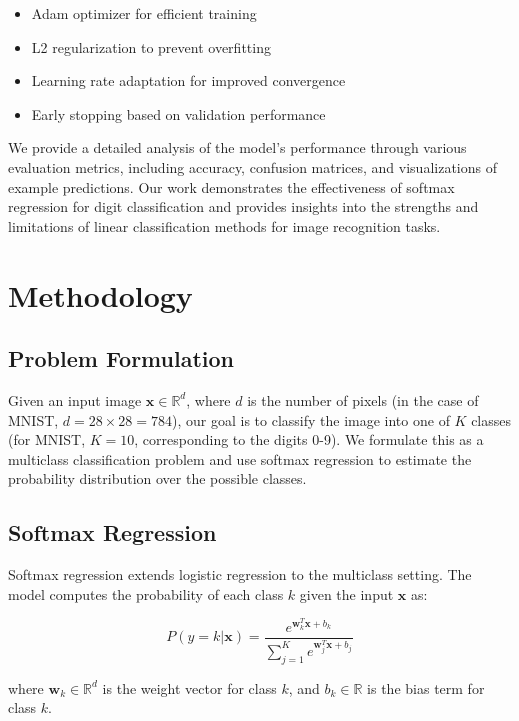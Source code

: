 \documentclass[10pt,journal,compsoc]{IEEEtran}
\begin{document}
\begin{itemize}
    \item Adam optimizer for efficient training
    \item L2 regularization to prevent overfitting
    \item Learning rate adaptation for improved convergence
    \item Early stopping based on validation performance
\end{itemize}

We provide a detailed analysis of the model's performance through various evaluation metrics, including accuracy, confusion matrices, and visualizations of example predictions. Our work demonstrates the effectiveness of softmax regression for digit classification and provides insights into the strengths and limitations of linear classification methods for image recognition tasks.

\section{Methodology}
\subsection{Problem Formulation}
Given an input image $\mathbf{x} \in \mathbb{R}^d$, where $d$ is the number of pixels (in the case of MNIST, $d = 28 \times 28 = 784$), our goal is to classify the image into one of $K$ classes (for MNIST, $K = 10$, corresponding to the digits 0-9). We formulate this as a multiclass classification problem and use softmax regression to estimate the probability distribution over the possible classes.

\subsection{Softmax Regression}
Softmax regression extends logistic regression to the multiclass setting. The model computes the probability of each class $k$ given the input $\mathbf{x}$ as:

\begin{equation}
P(y = k | \mathbf{x}) = \frac{e^{\mathbf{w}_k^T \mathbf{x} + b_k}}{\sum_{j=1}^{K} e^{\mathbf{w}_j^T \mathbf{x} + b_j}}
\end{equation}

where $\mathbf{w}_k \in \mathbb{R}^d$ is the weight vector for class $k$, and $b_k \in \mathbb{R}$ is the bias term for class $k$.
\end{document}
